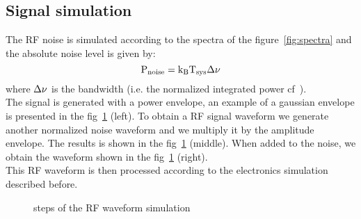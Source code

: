 \subsection{Signal simulation}
The  RF   noise  is  simulated   according  to  the  spectra   of  the
figure~\ref{fig:spectra} and the absolute noise level is given by:
\begin{equation}
  \rm  P_{noise} = k_B T_{sys} \Delta \nu 
\end{equation}
where  $\rm  \Delta  \nu$  is  the  bandwidth  (i.e.   the  normalized
integrated power cf~\cite{noteelec}).\\The  signal is generated with a
power envelope, an example of  a gaussian envelope is presented in the
fig~\ref{fig:exsignal}  (left).  To  obtain  a RF  signal waveform  we
generate another normalized  noise waveform and we multiply  it by the
amplitude envelope. The results is shown in the fig~\ref{fig:exsignal}
(middle).  When  added to the noise,  we obtain the  waveform shown in
the  fig~\ref{fig:exsignal}  (right).\\   This  RF  waveform  is  then
processed according to the electronics simulation described before.
\begin{figure}[!ht]
  \centering
  \hspace*{-3ex}
  \caption{steps of the RF waveform simulation}
  \label{fig:exsignal}
\end{figure}


